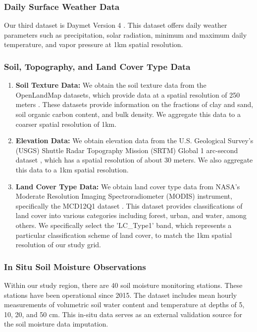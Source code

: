 \documentclass[11pt]{article}
\begin{document}
\subsubsection*{Daily Surface Weather Data}
Our third dataset is Daymet Version 4 \citep{thornton1840daymet}. This dataset offers daily weather parameters such as precipitation, solar radiation, minimum and maximum daily temperature, and vapor pressure at 1km spatial resolution. 

\subsubsection*{Soil, Topography, and Land Cover Type Data}
\begin{enumerate}

    
\item \textbf{Soil Texture Data:} We obtain the soil texture data from the OpenLandMap datasets, which provide data at a spatial resolution of 250 meters \citep{hengl2018clay}. These datasets provide information on the fractions of clay and sand, soil organic carbon content, and bulk density. We aggregate this data to a coarser spatial resolution of 1km.


\item \textbf{Elevation Data:}  We obtain elevation data from the U.S. Geological Survey's (USGS) Shuttle Radar Topography Mission (SRTM) Global 1 arc-second dataset \citep{farr2007shuttle}, which has a spatial resolution of about 30 meters. We also aggregate this data to a 1km spatial resolution.
    
    \item \textbf{Land Cover Type Data:} We obtain land cover type data from NASA's Moderate Resolution Imaging Spectroradiometer (MODIS) instrument, specifically the MCD12Q1 dataset \citep{friedl2022modis}. This dataset provides classifications of land cover into various categories including forest, urban, and water, among others. We specifically select the 'LC\_Type1' band, which represents a particular classification scheme of land cover, to match the 1km spatial resolution of our study grid.
 \end{enumerate}
 
 

\subsubsection*{In Situ Soil Moisture Observations}
Within our study region, there are 40 soil moisture monitoring stations. These stations have been operational since 2015. The dataset includes mean hourly measurements of volumetric soil water content and temperature at depths of 5, 10, 20, and 50 cm. This in-situ data serves as an external validation source for the soil moisture data imputation.
\end{document}
